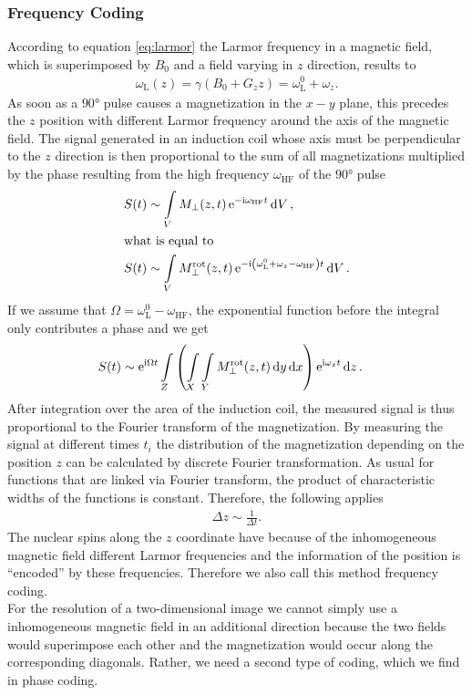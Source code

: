 \subsubsection{Frequency Coding}
According to equation \ref{eq:larmor} the Larmor frequency in a magnetic field, which is superimposed by $B_0$ and a field varying in $z$ direction, results to
\begin{align}
\omega_\text{L}(z)=\gamma(B_0+G_zz)=\omega_\text{L}^0+\omega_z.
\end{align}
As soon as a $\ang{90}$ pulse causes a magnetization in the $x-y$ plane, this precedes the $z$ position with different Larmor frequency around the axis of the magnetic field.
The signal generated in an induction coil whose axis must be perpendicular to the $z$ direction is then proportional to the sum of all magnetizations multiplied by the phase resulting from the high frequency $\omega_\text{HF}$ of the $\ang{90}$ pulse
\begin{align}
S(t)&\sim\int\limits_V M_\bot(z,t)\,\mathrm{e}^{-\mathrm{i}\omega_\text{HF}t}\dd{V},\\
\intertext{what is equal to}
S(t)&\sim\int\limits_V M_\bot^\text{rot}(z,t)\,\mathrm{e}^{-\mathrm{i}\left(\omega_\text{L}^0+\omega_z-\omega_\text{HF}\right)t}\dd{V}.
\end{align}
If we assume that $\Omega=\omega_\text{L}^0-\omega_\text{HF}$, the exponential function before the integral only contributes a phase and we get
\begin{align}
S(t)&\sim\mathrm{e}^{\mathrm{i}\Omega t}\int\limits_Z\left(\int\limits_X\int\limits_Y M_\bot^\text{rot}(z,t)\dd{y}\dd{x}\right)\mathrm{e}^{\mathrm{i}\omega_z t}\dd{z}.
\end{align}
After integration over the area of the induction coil, the measured signal is thus proportional to the Fourier transform of the magnetization.
By measuring the signal at different times $t_i$ the distribution of the magnetization depending on the position $z$ can be calculated by discrete Fourier transformation.
As usual for functions that are linked via Fourier transform, the product of characteristic widths of the functions is constant.
Therefore, the following applies
\begin{align}
\Delta z\sim\frac{1}{\Delta t}.
\end{align}
The nuclear spins along the $z$ coordinate have because of the inhomogeneous magnetic field different Larmor frequencies and the information of the position is \enquote{encoded} by these frequencies.
Therefore we also call this method frequency coding.\\
For the resolution of a two-dimensional image we cannot simply use a inhomogeneous magnetic field in an additional direction because the two fields would superimpose each other and the magnetization would occur along the corresponding diagonals.
Rather, we need a second type of coding, which we find in phase coding.

